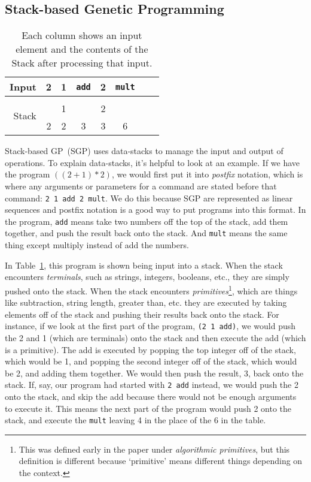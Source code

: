 \documentclass{sig-alternate}
\begin{document}
\subsection{Stack-based Genetic Programming}
\label{sec:sgp}
\begin{table}
	\centering
	\begin{tabular}{|r|c|c|c|c|c|c|c|}
		\hline
		Input & 2 & 1 & \texttt{add} & 2 & \texttt{mult} \\
		\hline
		\multirow{3}{*}{Stack} & & & & &\\
		&   & 1 &   & 2 &   \\
		& 2 & 2 & 3 & 3 & 6 \\
		\hline
	\end{tabular}
	\caption{Each column shows an input element and the contents of the Stack after processing that input.}
	\label{tab:stacks}
\end{table}

Stack-based GP~(SGP) uses data-stacks to manage the input and output of operations. To explain data-stacks, it's helpful to look at an example. If we have the program $((2+1)*2)$, we would first put it into \textit{postfix} notation, which is where any arguments or parameters for a command are stated before that command: \texttt{2~1~add~2~mult}. We do this because SGP are represented as linear sequences and postfix notation is a good way to put programs into this format. In the program, \texttt{add} means take two numbers off the top of the stack, add them together, and push the result back onto the stack. And \texttt{mult} means the same thing except multiply instead of add the numbers.

In Table~\ref{tab:stacks}, this program is shown being input into a stack. When the stack encounters \textit{terminals}, such as strings, integers, booleans, etc., they are simply pushed onto the stack. When the stack encounters \textit{primitives}\footnote{This was defined early in the paper under \textit{algorithmic primitives}, but this definition is different because `primitive' means different things depending on the context.}, which are things like subtraction, string length, greater than, etc. they are executed by taking elements off of the stack and pushing their results back onto the stack. For instance, if we look at the first part of the program, \texttt{(2~1~add)}, we would push the 2 and 1 (which are terminals) onto the stack and then execute the add (which is a primitive). The add is executed by popping the top integer off of the stack, which would be 1, and popping the second integer off of the stack, which would be 2, and adding them together. We would then push the result, 3, back onto the stack. If, say, our program had started with \texttt{2 add} instead, we would push the 2 onto the stack, and skip the add because there would not be enough arguments to execute it. This means the next part of the program would push 2 onto the stack, and execute the \texttt{mult} leaving 4 in the place of the 6 in the table.
\end{document}
